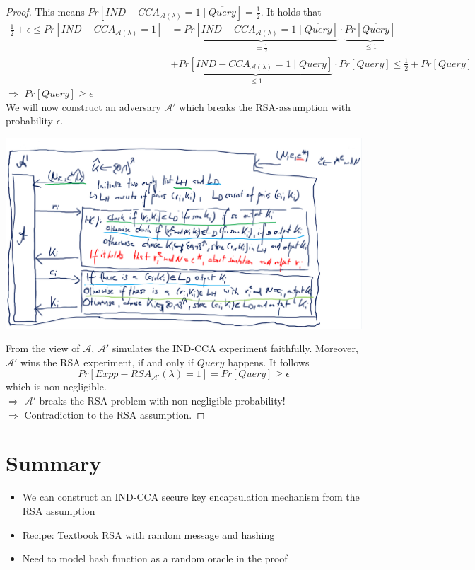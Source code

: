 \begin{proof}
            This means $Pr[IND-CCA_{\mathcal{A}(\lambda)}=1 \mid \overline{Query}] = \frac{1}{2}$. It holds that
            \begin{align*}
                \frac{1}{2} + \epsilon \leq Pr[IND-CCA_{\mathcal{A}(\lambda)}=1] &= \underbrace{Pr[IND-CCA_{\mathcal{A}(\lambda)}=1 \mid \overline{Query}]}_{= \frac{1}{2}} 
                \cdot \underbrace{Pr[\overline{Query}]}_{\leq 1}\\
                &+ \underbrace{Pr[IND-CCA_{\mathcal{A}(\lambda)}=1 \mid Query]}_{\leq 1} \cdot Pr[Query] \leq \frac{1}{2} + Pr[Query]
            \end{align*}
            $\Rightarrow$ $Pr[Query] \geq \epsilon$\\
            We will now construct an adversary $\mathcal{A}'$ which breaks the RSA-assumption with probability $\epsilon$.
            \begin{center}
	            \includegraphics[width=160mm]{Graphics/IND-CCA secure Key Encapsulation from RSA/bla2.png}
            \end{center}
            From the view of $\mathcal{A}$, $\mathcal{A}'$ simulates the IND-CCA experiment faithfully.
            Moreover, $\mathcal{A}'$ wins the RSA experiment, if and only if $Query$ happens.
            It follows
            $$Pr[Expp-RSA_{\mathcal{A}'}(\lambda)=1] = Pr[Query] \geq \epsilon$$
            which is non-negligible.\\
            $\Rightarrow$ $\mathcal{A}'$ breaks the RSA problem with non-negligible probability!\\
            $\Rightarrow$ Contradiction to the RSA assumption.
        \end{proof}

    \section{Summary}
        \begin{itemize}
            \item We can construct an IND-CCA secure key encapsulation mechanism from the RSA assumption
            \item Recipe: Textbook RSA with random message and hashing
            \item Need to model hash function as a random oracle in the proof
        \end{itemize}



